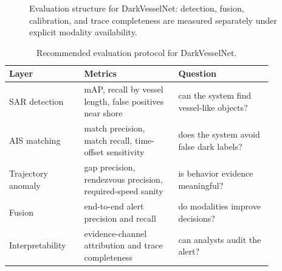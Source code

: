 \documentclass{article}
\begin{document}
\begin{figure}[t]
\centering
{}
\caption{Evaluation structure for DarkVesselNet: detection, fusion, calibration, and trace completeness are measured separately under explicit modality availability.}
\label{fig:darkvessel-eval}
\end{figure}

\begin{table}[t]
\centering
\caption{Recommended evaluation protocol for DarkVesselNet.}
\label{tab:dark_protocol}
\begin{tabular}{@{}p{0.24\linewidth}p{0.31\linewidth}p{0.31\linewidth}@{}}
\toprule
\textbf{Layer} & \textbf{Metrics} & \textbf{Question}\\
\midrule
SAR detection & mAP, recall by vessel length, false positives near shore & can the system find vessel-like objects?\\
AIS matching & match precision, match recall, time-offset sensitivity & does the system avoid false dark labels?\\
Trajectory anomaly & gap precision, rendezvous precision, required-speed sanity & is behavior evidence meaningful?\\
Fusion & end-to-end alert precision and recall & do modalities improve decisions?\\
Interpretability & evidence-channel attribution and trace completeness & can analysts audit the alert?\\
\bottomrule
\end{tabular}
\end{table}
\end{document}
